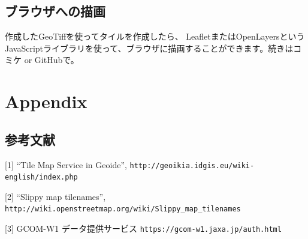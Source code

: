 \section*{ブラウザへの描画}
作成したGeoTiffを使ってタイルを作成したら、
LeafletまたはOpenLayersというJavaScriptライブラリを使って、ブラウザに描画することができます。続きはコミケ or GitHubで。

\chapter*{Appendix}




\section*{参考文献}
         [1] ``Tile Map Service in Geoide'', \texttt{http://geoikia.idgis.eu/wiki-english/index.php}
       
       [2] ``Slippy map tilenames'', \texttt{http://wiki.openstreetmap.org/wiki/Slippy\_map\_tilenames}
       
[3] GCOM-W1 データ提供サービス \texttt{https://gcom-w1.jaxa.jp/auth.html}



